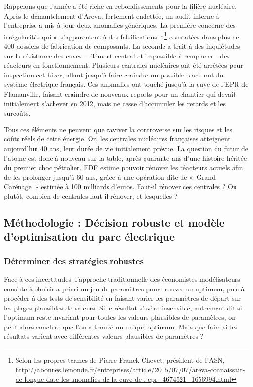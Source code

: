 Rappelons que l’année a été riche en rebondissements pour la filière nucléaire. Après le démantèlement d’Areva, fortement endettée, un audit interne à l’entreprise a mis à jour deux anomalies génériques. La première concerne des irrégularités qui «~s'apparentent à des falsifications~»\footnote{Selon les propres termes de Pierre-Franck Chevet, président de l'ASN, \url{http://abonnes.lemonde.fr/entreprises/article/2015/07/07/areva-connaissait-de-longue-date-les-anomalies-de-la-cuve-de-l-epr_4674521_1656994.html}} constatées dans plus de 400 dossiers de fabrication de composants. La seconde a trait à des inquiétudes sur la résistance des cuves – élément central et impossible à remplacer - des réacteurs en fonctionnement. Plusieurs centrales nucléaires ont été arrêtées pour inspection cet hiver, allant jusqu’à faire craindre un possible black-out du système électrique français. Ces anomalies ont touché jusqu’à la cuve de l’EPR de Flamanville, faisant craindre de nouveaux reports pour un chantier qui devait initialement s’achever en 2012, mais ne cesse d’accumuler les retards et les surcoûts. 

Tous ces éléments ne peuvent que raviver la controverse sur les risques et les coûts réels de cette énergie. 
Or, les centrales nucléaires françaises atteignent aujourd’hui 40 ans, leur durée de vie initialement prévue. La question du futur de l’atome est donc à nouveau sur la table, après quarante ans d’une histoire héritée du premier choc pétrolier. EDF estime pouvoir rénover les réacteurs actuels afin de les prolonger jusqu’à 60 ans, grâce à une opération dite de «~Grand Carénage~» estimée à 100 milliards d’euros. Faut-il rénover ces centrales ? Ou plutôt, combien de centrales faut-il rénover, et lesquelles ?

\subsection{Méthodologie : Décision robuste et modèle d’optimisation du parc électrique}

\subsubsection{Déterminer des stratégies robustes}

Face à ces incertitudes, l’approche traditionnelle des économistes modélisateurs consiste à choisir a priori un jeu de paramètres pour trouver un optimum, puis à procéder à des tests de sensibilité en faisant varier les paramètres de départ sur les plages plausibles de valeurs. Si le résultat s’avère insensible, autrement dit si l’optimum reste invariant pour toutes les valeurs plausibles de paramètres, on peut alors conclure que l’on a trouvé un unique optimum.
Mais que faire si les résultats varient avec différentes valeurs plausibles de paramètres ? 

